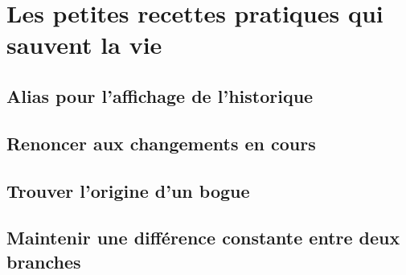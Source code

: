 \chapter{Les petites recettes pratiques qui sauvent la vie}\label{chapRecettes} %

\section{Alias pour l'affichage de l'historique} %

\section{Renoncer aux changements en cours} %

\section{Trouver l'origine d'un bogue} %

\section{Maintenir une différence constante entre deux branches} %

